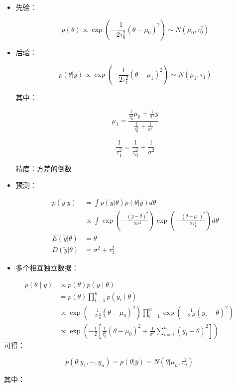 \begin{itemize}
\item
  先验：

  \[p(\theta)\propto\exp\left(-\frac{1}{2\tau_0^2}(\theta-\mu_0)^2\right)
  \sim N(\mu_0,\tau_0^2)\]
\item
  后验：

  \[p(\theta|y)\propto\exp\left(-\frac{1}{2\tau_1^2}(\theta-\mu_1)^2\right)
  \sim N(\mu_1,\tau_1)\]

  其中：

  \[\mu_1=\frac
  {\frac{1}{\tau_0^2}\mu_0+\frac{1}{\sigma^2}y}
  {\frac{1}{\tau_0^2}+\frac{1}{\sigma^2}}\]

  \[\frac{1}{\tau_1^2}=\frac{1}{\tau_0^2}+\frac{1}{\sigma^2}\]

  精度：方差的倒数
\item
  预测：

  \begin{align*}
  p(\widetilde y|y)&=\int p(\widetilde y | \theta)p(\theta|y)d\theta\\
  &\propto
  \int\exp\left(-\frac{(\widetilde y - \theta)^2}{2\sigma^2}\right)
  \exp \left(-\frac{(\theta-\mu_1)^2}{2\tau_1^2}\right)d\theta
  \\
  E(\widetilde y|\theta)&=\theta\\
  D(\widetilde y|\theta)&=\sigma^2+\tau^2_1
  \end{align*}
\item
  多个相互独立数据：
\end{itemize}


\begin{equation}
  \begin{aligned}
  p(\theta \mid y) & \propto p(\theta) p(y \mid \theta) 
  \\&=p(\theta) \prod_{i=1}^{n} p\left(y_{i} \mid \theta\right) 
  \\& \propto \exp \left(-\frac{1}{2 \tau_{0}^{2}}\left(\theta-\mu_{0}\right)^{2}\right) \prod_{i=1}^{n} \exp \left(-\frac{1}{2 \sigma^{2}}\left(y_{i}-\theta\right)^{2}\right) 
  \\& \propto \exp \left(-\frac{1}{2}\left[\frac{1}{\tau_{0}^{2}}\left(\theta-\mu_{0}\right)^{2}+\frac{1}{\sigma^{2}} \sum_{i=1}^{n}\left(y_{i}-\theta\right)^{2}\right]\right)
  \end{aligned}
\end{equation}
可得：

\[p(\theta|y_1,\cdots,y_n)=p(\theta|\bar y)=N(\theta | \mu_n,\tau_n^2)\]

其中：

